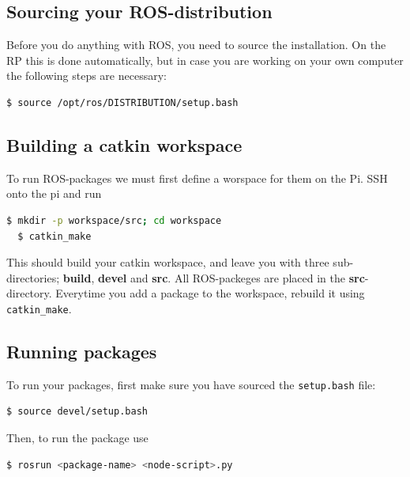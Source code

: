 \subsection{Sourcing your ROS-distribution}

Before you do anything with ROS, you need to source the installation. On the RP this is done automatically, but in case you are working on your own computer the following steps are necessary: 

\begin{lstlisting}[language=bash,basicstyle=\mlttfamily, breaklines=true]
  $ source /opt/ros/DISTRIBUTION/setup.bash
\end{lstlisting}

\subsection{Building a catkin workspace}

To run ROS-packages we must first define a worspace for them on the Pi. SSH onto the pi and run 

\begin{lstlisting}[language=bash,basicstyle=\mlttfamily, breaklines=true]
  $ mkdir -p workspace/src; cd workspace
  $ catkin_make
\end{lstlisting}

This should build your catkin workspace, and leave you with three sub-directories; \textbf{build}, \textbf{devel} and \textbf{src}. All ROS-packeges are placed in the \textbf{src}-directory. Everytime you add a package to the workspace, rebuild it using \lstinline{catkin_make}.

\subsection{Running packages}

To run your packages, first make sure you have sourced the \lstinline{setup.bash} file:

\begin{lstlisting}[language=bash,basicstyle=\mlttfamily, breaklines=true]
  $ source devel/setup.bash
\end{lstlisting}

Then, to run the package use

\begin{lstlisting}[language=bash,basicstyle=\mlttfamily, breaklines=true]
  $ rosrun <package-name> <node-script>.py
\end{lstlisting}

